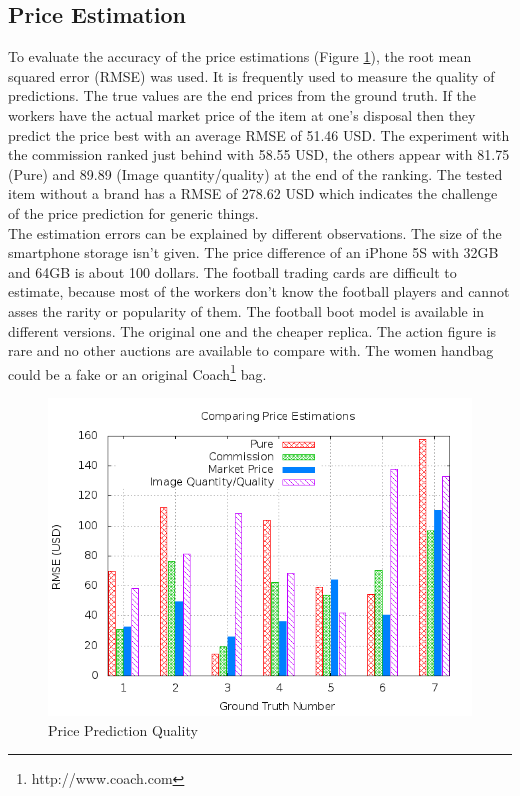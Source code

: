 \subsection{Price Estimation}
To evaluate the accuracy of the price estimations (Figure \ref{crowdsourcing_price_pred}), the root mean squared error (RMSE) was used. It is frequently used to measure the quality of predictions. The true values are the end prices from the ground truth. If the workers have the actual market price of the item at one's disposal then they predict the price best with an average RMSE of 51.46 USD. The experiment with the commission ranked just behind with 58.55 USD, the others appear with 81.75 (Pure) and 89.89 (Image quantity/quality) at the end of the ranking. The tested item without a brand has a RMSE of 278.62 USD which indicates the challenge of the price prediction for generic things.\\
The estimation errors can be explained by different observations. The size of the smartphone storage isn't given. The price difference of an iPhone 5S with 32GB and 64GB is about 100 dollars. The football trading cards are difficult to estimate, because most of the workers don't know the football players and cannot asses the rarity or popularity of them. The football boot model is available in different versions. The original one and the cheaper replica. The action figure is rare and no other auctions are available to compare with. The women handbag could be a fake or an original Coach\footnote{http://www.coach.com} bag.
\begin{figure}
\centering
\includegraphics[scale=0.55]{images/plots/crowdsourcing/plot_price_rmse.png}
\caption{Price Prediction Quality}
\label{crowdsourcing_price_pred}
\end{figure}
